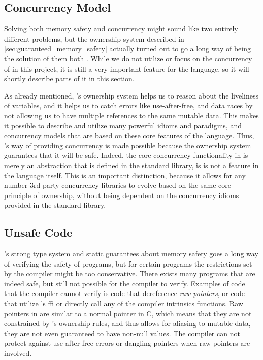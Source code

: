 \subsection{Concurrency Model} %
\label{ssub:concurrency_model}

Solving both memory safety and concurrency might sound like two entirely different problems, but the ownership system described in \autoref{sec:guaranteed_memory_safety} actually turned out to go a long way of being the solution of them both \cite{web:fearless_concurrency_with_rust}.
While we do not utilize or focus on the concurrency of \rust in this project, it is still a very important feature for the language, so it will shortly describe parts of it in this section.

As already mentioned, \rust's ownership system helps us to reason about the liveliness of variables, and it helps us to catch errors like use-after-free, and data races by not allowing us to have multiple references to the same mutable data.
This makes it possible to describe and utilize many powerful idioms and paradigms, and concurrency models that are based on these core features of the language.
Thus, \rust's way of providing concurrency is made possible because the ownership system guarantees that it will be safe.
Indeed, the core concurrency functionality in \rust is merely an abstraction that is defined in the standard library, is is not a feature in the language itself.
This is an important distinction, because it allows for any number 3rd party concurrency libraries to evolve based on the same core principle of ownership, without being dependent on the concurrency idioms provided in the standard library.

\subsection{Unsafe Code} %
\label{ssub:unsafe_code}

\rust's strong type system and static guarantees about memory safety goes a long way of verifying the safety of programs, but for certain programs the restrictions set by the compiler might be too conservative.
There exists many programs that are indeed safe, but still not possible for the compiler to verify.
Examples of code that the compiler cannot verify is code that dereference \emph{raw pointers}, or code that utilize \rust's \gls{ffi} or directly call any of the compiler intrinsics functions.
Raw pointers in \rust are similar to a normal pointer in C, which means that they are not constrained by \rust's ownership rules, and thus allows for aliasing to mutable data, they are not even guaranteed to have non-null values.
The compiler can not protect against use-after-free errors or dangling pointers when raw pointers are involved.

